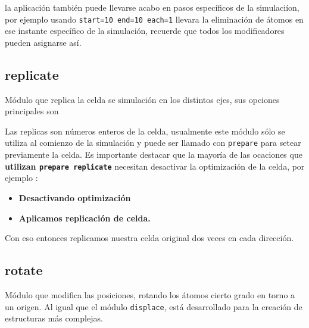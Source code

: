 la aplicaci\'on tambi\'en puede llevarse acabo en pasos espec\'ificos de la simulaci\'ion, por ejemplo usando \texttt{start=10 end=10 each=1} llevara la eliminaci\'on de \'atomos en ese instante espec\'ifico de la simulaci\'on, recuerde que todos los modificadores pueden asignarse as\'i.

\subsection{replicate}
M\'odulo que replica la celda se simulaci\'on en los distintos ejes, sus opciones principales son


Las replicas son n\'umeros enteros de la celda, usualmente este m\'odulo s\'olo se utiliza al comienzo de la simulaci\'on y puede ser llamado con \verb|prepare| para setear previamente la celda. Es importante destacar que la mayor\'ia de las ocaciones que \textbf{utilizan \texttt{prepare replicate}} necesitan desactivar la optimizaci\'on de la celda, por ejemplo :

\begin{itemize}
 \item \textbf{Desactivando optimizaci\'on}
 \item \textbf{Aplicamos replicaci\'on de celda.}
\end{itemize}

Con eso entonces replicamos nuestra celda original dos veces en cada direcci\'on.


\subsection{rotate}
M\'odulo que modifica las posiciones, rotando los \'atomos cierto grado en torno a un origen. Al igual que el m\'odulo \verb|displace|, est\'a desarrollado para la creaci\'on de estructuras m\'as complejas.


